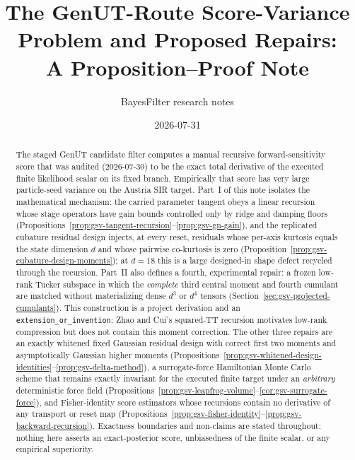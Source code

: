 \documentclass[11pt]{article}
\title{The GenUT-Route Score-Variance Problem and Proposed Repairs:\\
A Proposition--Proof Note}
\author{BayesFilter research notes}
\date{2026-07-31}
\theoremstyle{definition}
\theoremstyle{remark}
\begin{document}
\maketitle

\begin{abstract}
The staged GenUT candidate filter computes a manual recursive
forward-sensitivity score that was audited (2026-07-30) to be the exact total
derivative of the executed finite likelihood scalar on its fixed branch.
Empirically that score has very large particle-seed variance on the Austria
SIR target.  Part~I of this note isolates the mathematical mechanism: the
carried parameter tangent obeys a linear recursion whose stage operators have
gain bounds controlled only by ridge and damping floors
(Propositions~\ref{prop:gsv-tangent-recursion}--\ref{prop:gsv-gn-gain}), and
the replicated cubature residual design injects, at every reset, residuals
whose per-axis kurtosis equals the state dimension $d$ and whose pairwise
co-kurtosis is zero (Proposition~\ref{prop:gsv-cubature-design-moments}); at
$d=18$ this is a large designed-in shape defect recycled through the
recursion.  Part~II also defines a fourth, experimental repair: a frozen
low-rank Tucker subspace in which the \emph{complete} third central moment
and fourth cumulant are matched without materializing dense $d^3$ or $d^4$
tensors (Section~\ref{sec:gsv-projected-cumulants}).  This construction is a
project derivation and an \texttt{extension\_or\_invention}; Zhao and Cui's
squared-TT recursion motivates low-rank compression but does not contain this
moment correction.  The other three repairs are an exactly whitened fixed Gaussian
residual design with correct first two moments and asymptotically Gaussian
higher moments
(Propositions~\ref{prop:gsv-whitened-design-identities}--\ref{prop:gsv-delta-method}),
a surrogate-force Hamiltonian Monte Carlo scheme that remains exactly
invariant for the executed finite target under an \emph{arbitrary}
deterministic force field
(Propositions~\ref{prop:gsv-leapfrog-volume}--\ref{cor:gsv-surrogate-force}),
and Fisher-identity score estimators whose recursions contain no derivative
of any transport or reset map
(Propositions~\ref{prop:gsv-fisher-identity}--\ref{prop:gsv-backward-recursion}).
Exactness boundaries and non-claims are stated throughout: nothing here
asserts an exact-posterior score, unbiasedness of the finite scalar, or any
empirical superiority.
\end{abstract}

\tableofcontents
\end{document}
